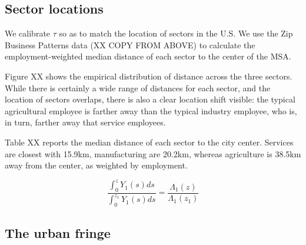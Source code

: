 \documentclass[12pt]{article}
\begin{document}
\subsection{Sector locations}
We calibrate $\tau$ so as to match the location of sectors in the U.S. We use the Zip Business Patterns data (XX COPY FROM ABOVE) to calculate the employment-weighted median distance of each sector to the center of the MSA.

Figure XX shows the empirical distribution of distance across the three sectors. While there is certainly a wide range of distances for each sector, and the location of sectors overlaps, there is also a clear location shift visible: the typical agricultural employee is farther away than the typical industry employee, who is, in turn, farther away that service employees.

Table XX reports the median distance of each sector to the city center. Services are closest with 15.9km, manufacturing are 20.2km, whereas agriculture is 38.5km away from the center, as weighted by employment.

\[
\frac{\int_0^z Y_1(s)ds}{\int_0^{z_1} Y_1(s)ds} = \frac{\Lambda_1(z)}{\Lambda_1(z_1)}
\]

\subsection{The urban fringe}
\end{document}
